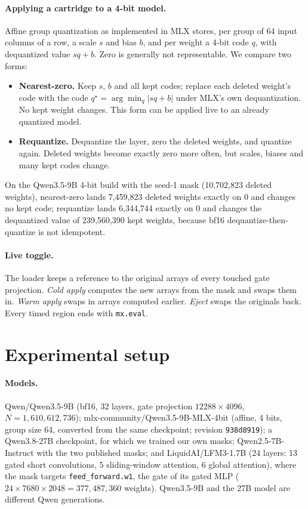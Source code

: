 \documentclass[11pt]{article}
\begin{document}
\paragraph{Applying a cartridge to a 4-bit model.} Affine group quantization as implemented in MLX \citep{mlx2023} stores, per group of 64 input columns of a row, a scale $s$ and bias $b$, and per weight a 4-bit code $q$, with dequantized value $sq+b$. Zero is generally not representable. We compare two forms:
\begin{itemize}
\item \textbf{Nearest-zero.} Keep $s$, $b$ and all kept codes; replace each deleted weight's code with the code $q^\star = \arg\min_q |sq+b|$ under MLX's own dequantization. No kept weight changes. This form can be applied live to an already quantized model.
\item \textbf{Requantize.} Dequantize the layer, zero the deleted weights, and quantize again. Deleted weights become exactly zero more often, but scales, biases and many kept codes change.
\end{itemize}
On the Qwen3.5-9B 4-bit build with the seed-1 mask (10,702,823 deleted weights), nearest-zero lands 7,459,823 deleted weights exactly on 0 and changes no kept code; requantize lands 6,344,744 exactly on 0 and changes the dequantized value of 239,560,390 kept weights, because bf16 dequantize-then-quantize is not idempotent.

\paragraph{Live toggle.} The loader keeps a reference to the original arrays of every touched gate projection. \emph{Cold apply} computes the new arrays from the mask and swaps them in. \emph{Warm apply} swaps in arrays computed earlier. \emph{Eject} swaps the originals back. Every timed region ends with \texttt{mx.eval}.

\section{Experimental setup}
\label{sec:setup}

\paragraph{Models.} Qwen/Qwen3.5-9B (bf16, 32 layers, gate projection $12288\times4096$, $N = 1{,}610{,}612{,}736$); mlx-community/Qwen3.5-9B-MLX-4bit (affine, 4 bits, group size 64, converted from the same checkpoint; revision \texttt{938d8919}); a Qwen3.8-27B checkpoint, for which we trained our own masks; Qwen2.5-7B-Instruct \citep{qwen2024qwen25} with the two published masks; and LiquidAI/LFM3-1.7B \citep{liquid2026lfm3} (24 layers: 13 gated short convolutions, 5 sliding-window attention, 6 global attention), where the mask targets \texttt{feed\_forward.w1}, the gate of its gated MLP ($24 \times 7680 \times 2048 = 377{,}487{,}360$ weights). Qwen3.5-9B and the 27B model are different Qwen generations.
\end{document}
